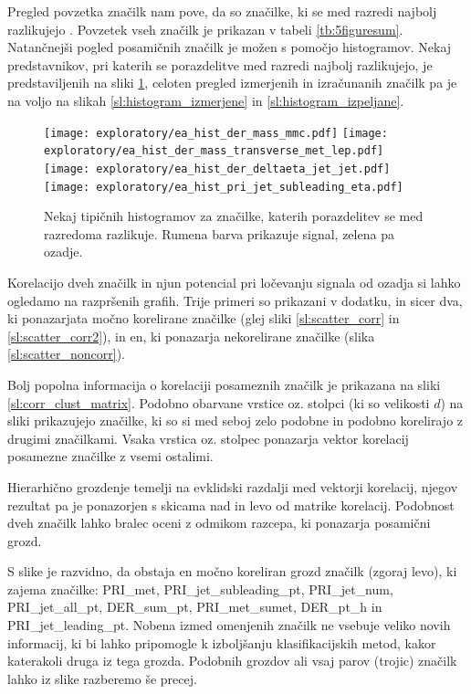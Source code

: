 \documentclass[11pt,a4paper,openany]{book}
\begin{document}
Pregled povzetka značilk nam pove, da so značilke, ki se med razredi najbolj razlikujejo . Povzetek vseh značilk je prikazan v tabeli \ref{tb:5figuresum}. Natančnejši pogled posamičnih značilk je možen s pomočjo histogramov. Nekaj predstavnikov, pri katerih se porazdelitve med razredi najbolj razlikujejo, je predstaviljenih na sliki \ref{sl:histogrami}, celoten pregled izmerjenih in izračunanih značilk pa je na voljo na slikah \ref{sl:histogram_izmerjene} in \ref{sl:histogram_izpeljane}.

\begin{figure}[ht]
	\texttt{[image: exploratory/ea\_hist\_der\_mass\_mmc.pdf]}
	\texttt{[image: exploratory/ea\_hist\_der\_mass\_transverse\_met\_lep.pdf]}	
	\texttt{[image: exploratory/ea\_hist\_der\_deltaeta\_jet\_jet.pdf]}		
	\texttt{[image: exploratory/ea\_hist\_pri\_jet\_subleading\_eta.pdf]}	
	\caption{Nekaj tipičnih histogramov za značilke, katerih porazdelitev se med razredoma razlikuje. Rumena barva prikazuje signal, zelena pa ozadje.}
	\label{sl:histogrami}			
\end{figure}

Korelacijo dveh značilk in njun potencial pri ločevanju signala od ozadja si lahko ogledamo na razpršenih grafih. Trije primeri so prikazani v dodatku, in sicer dva, ki ponazarjata močno korelirane značilke (glej sliki \ref{sl:scatter_corr} in \ref{sl:scatter_corr2}), in en, ki ponazarja nekorelirane značilke (slika \ref{sl:scatter_noncorr}).

Bolj popolna informacija o korelaciji posameznih značilk je prikazana na sliki \ref{sl:corr_clust_matrix}. Podobno obarvane vrstice oz. stolpci (ki so velikosti $d$) na sliki prikazujejo značilke, ki so si med seboj zelo podobne in podobno korelirajo z drugimi značilkami. Vsaka vrstica oz. stolpec ponazarja vektor korelacij posamezne značilke z vsemi ostalimi.

Hierarhično grozdenje temelji na evklidski razdalji med vektorji korelacij, njegov rezultat pa je ponazorjen s skicama nad in levo od matrike korelacij. Podobnost dveh značilk lahko bralec oceni z odmikom razcepa, ki ponazarja posamični grozd.

S slike je razvidno, da obstaja en močno koreliran grozd značilk (zgoraj levo), ki zajema značilke: PRI\_met, PRI\_jet\_subleading\_pt, PRI\_jet\_num, PRI\_jet\_all\_pt, DER\_sum\_pt, PRI\_met\_sumet, DER\_pt\_h in PRI\_jet\_leading\_pt. Nobena izmed omenjenih značilk ne vsebuje veliko novih informacij, ki bi lahko pripomogle k izboljšanju klasifikacijskih metod, kakor katerakoli druga iz tega grozda. Podobnih grozdov ali vsaj parov (trojic) značilk lahko iz slike razberemo še precej.
\end{document}
